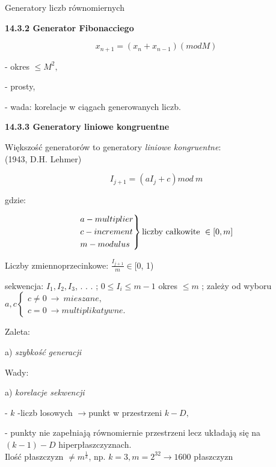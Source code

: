     \begin{frame}{Generatory liczb równomiernych}

	\textbf{14.3.2 Generator Fibonacciego}
	\begin{center}
 	$$x_{n+1} = (x_{n} + x_{n-1})(mod M)$$
	\end{center}
	- okres $\leq M^{2},$

	- prosty,

	- wada: korelacje w ciągach generowanych liczb.
    \newline
	\end{frame}
    \begin{frame}
	\textbf{14.3.3 Generatory liniowe kongruentne}

	Większość generatorów to generatory {\it liniowe kongruentne}:\\ (1943, D.H. Lehmer)
	\begin{center}
 	$$I_{j+1} = (aI_{j}+c) mod\ m$$
	\end{center}
	gdzie:

    \[
    {\begin{rcases*}
	a - multiplier\\
	c - increment\\
	m - modulus
    \end{rcases*} \text{liczby całkowite} \ \in [0,m]}
    \]
	\end{frame}
    \begin{frame}
	Liczby zmiennoprzecinkowe: $\displaystyle \frac{I_{j+1}}{m}\in[0$, 1)
    \newline

	sekwencja: $I_{1}, I_{2}, I_{3}$, . . . ; $0\leq I_{i}\leq m-1$
    \newline \newline
    okres $\leq m$ ; zależy od wyboru $a, c \left\{\begin{array}{l}
	c\neq 0\ \rightarrow\ mieszane,\\
	c=0\ \rightarrow multiplikatywne.
	\end{array}\right.$

	Zaleta:

	a) {\it szybkość generacji}
	\newline

	Wady:

	a) {\it korelacje sekwencji}

	- $k$ -liczb losowych $\rightarrow$punkt w przestrzeni $k-D,$

	- punkty nie zapełniają równomiernie przestrzeni lecz układają się na $(k-1)-D$ hiperpłaszczyznach.\\
	Ilość płaszczyzn $\neq m^{\frac{1}{k}}$, np. $k=3, m=2^{32}\rightarrow 1600$ płaszczyzn

    \end{frame}
